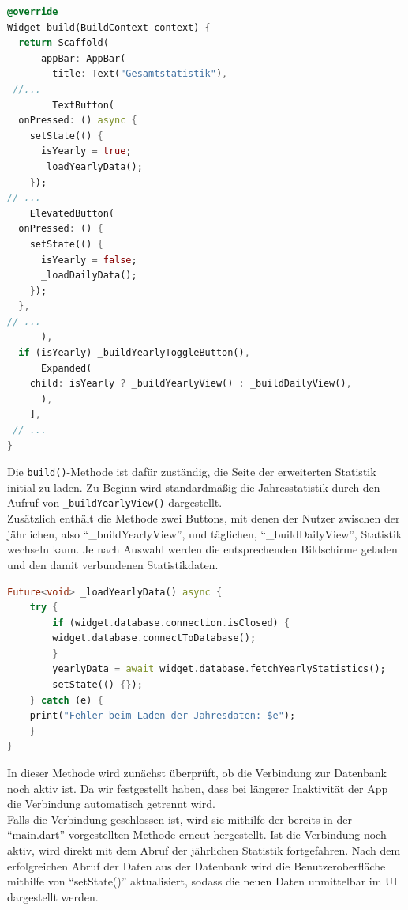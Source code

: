 \documentclass{article}
\begin{document}
    \begin{lstlisting}[language=Dart]
@override
Widget build(BuildContext context) {
  return Scaffold(
      appBar: AppBar(
        title: Text("Gesamtstatistik"),
 //...
        TextButton(
  onPressed: () async {
    setState(() {
      isYearly = true;
      _loadYearlyData();
    });
// ...
    ElevatedButton(
  onPressed: () {
    setState(() {
      isYearly = false;
      _loadDailyData();
    });
  },
// ...
      ),
  if (isYearly) _buildYearlyToggleButton(),
      Expanded(
    child: isYearly ? _buildYearlyView() : _buildDailyView(),
      ),
    ],
 // ...
}
    \end{lstlisting}
    Die \texttt{build()}-Methode ist dafür zuständig, die Seite der erweiterten Statistik initial zu laden.
    Zu Beginn wird standardmäßig die Jahresstatistik durch den Aufruf von \texttt{\_buildYearlyView()} dargestellt. \\
    Zusätzlich enthält die Methode zwei Buttons, mit denen der Nutzer zwischen der jährlichen, also \enquote{_buildYearlyView},
    und täglichen, \enquote{_buildDailyView}, Statistik wechseln kann.
    Je nach Auswahl werden die entsprechenden Bildschirme geladen und den damit verbundenen Statistikdaten.

    \begin{lstlisting}[language=Dart]
Future<void> _loadYearlyData() async {
    try {
        if (widget.database.connection.isClosed) {
        widget.database.connectToDatabase();
        }
        yearlyData = await widget.database.fetchYearlyStatistics();
        setState(() {});
    } catch (e) {
    print("Fehler beim Laden der Jahresdaten: $e");
    }
}
    \end{lstlisting}
    In dieser Methode wird zunächst überprüft, ob die Verbindung zur Datenbank noch aktiv ist.
    Da wir festgestellt haben, dass bei längerer Inaktivität der App die Verbindung automatisch getrennt wird. \\
    Falls die Verbindung geschlossen ist, wird sie mithilfe der bereits in der \enquote{main.dart} vorgestellten
    Methode erneut hergestellt.
    Ist die Verbindung noch aktiv, wird direkt mit dem Abruf der jährlichen Statistik fortgefahren.
    Nach dem erfolgreichen Abruf der Daten aus der Datenbank wird die Benutzeroberfläche mithilfe von
    \enquote{setState()} aktualisiert, sodass die neuen Daten unmittelbar im UI dargestellt werden.
\end{document}

